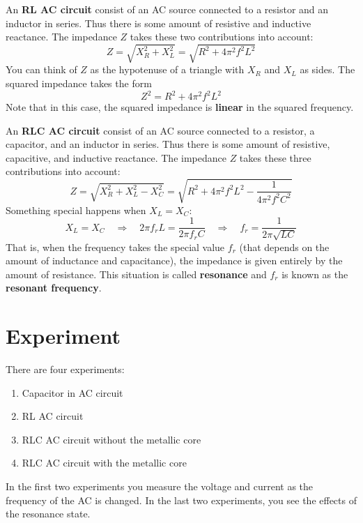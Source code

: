 An \textbf{RL AC circuit} consist of an AC source connected to a resistor and an inductor in series. Thus there is some amount of resistive and inductive reactance. The impedance $Z$ takes these two contributions into account:
\begin{equation} \label{eq.06.impedance.RL}
	Z = \sqrt{X_{R}^{2} + X_{L}^{2}} = \sqrt{R^{2} + 4 \pi^{2} f^{2} L^{2}}
\end{equation}
You can think of $Z$ as the hypotenuse of a triangle with $X_{R}$ and $X_{L}$ as sides. The squared impedance takes the form
\begin{equation} \label{eq.06.impedance.squared}
	Z^{2} = R^{2} + 4\pi^{2} f^{2} L^{2}
\end{equation}
Note that in this case, the squared impedance is \textbf{linear} in the squared frequency.

An \textbf{RLC AC circuit} consist of an AC source connected to a resistor, a capacitor, and an inductor in series. Thus there is some amount of resistive, capacitive, and inductive reactance. The impedance $Z$ takes these three contributions into account:
\begin{equation} \label{eq.06.eq.06.impedance.RLC}
	Z = \sqrt{X_{R}^{2} + X_{L}^{2} - X_{C}^{2}} = \sqrt{R^{2} + 4 \pi^{2} f^{2} L^{2} - \frac{1}{4 \pi^{2} f^{2} C^{2}}}
\end{equation}
Something special happens when $X_{L} = X_{C}$:
\begin{equation} \label{eq.06.resonant.frequency}
	X_{L} = X_{C} \quad \Longrightarrow \quad 2\pi f_{r} L = \frac{1}{2\pi f_{r} C} \quad \Longrightarrow \quad f_{r} = \frac{1}{2 \pi \sqrt{LC}}
\end{equation}
That is, when the frequency takes the special value $f_{r}$ (that depends on the amount of inductance and capacitance), the impedance is given entirely by the amount of resistance. This situation is called \textbf{resonance} and $f_{r}$ is known as the \textbf{resonant frequency}.
\section{Experiment}
There are four experiments:
\begin{enumerate}
	\item Capacitor in AC circuit
	\item RL AC circuit
	\item RLC AC circuit without the metallic core
	\item RLC AC circuit with the metallic core
\end{enumerate}
In the first two experiments you measure the voltage and current as the frequency of the AC is changed. In the last two experiments, you see the effects of the resonance state.
